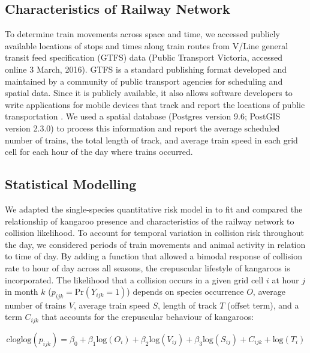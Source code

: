 \subsection{Characteristics of Railway Network}

To determine train movements across space and time, we accessed publicly available locations of stops and times along train routes from V/Line general transit feed specification (GTFS) data (Public Transport Victoria, accessed online 3 March, 2016).  GTFS is a standard publishing format developed and maintained by a community of public transport agencies for scheduling and spatial data.  Since it is publicly available, it also allows software developers to write applications for mobile devices that track and report the locations of public transportation \citep[see][]{hill11}.  We used a spatial database (Postgres version 9.6; PostGIS version 2.3.0) to process this information and report the average scheduled number of trains, the total length of track, and average train speed in each grid cell for each hour of the day where trains occurred.

\subsection{Statistical Modelling}

We adapted the single-species quantitative risk model in  to fit and compared the relationship of kangaroo presence and characteristics of the railway network to collision likelihood. To account for temporal variation in collision risk throughout the day, we considered periods of train movements and animal activity in relation to time of day. By adding a function that allowed a bimodal response of collision rate to hour of day across all seasons, the crepuscular lifestyle of kangaroos \citep[most active at dawn and dusk; see][]{daws12} is incorporated. The likelihood that a collision occurs in a given grid cell $i$ at hour $j$ in month $k$ ($p_{ijk} = \text{Pr}(Y_{ijk}=1)$) depends on species occurrence $O$, average number of trains $V$, average train speed $S$, length of track $T$ (offset term), and a term $C_{ijk}$ that accounts for the crepuscular behaviour of kangaroos:

\begin{equation} \label{eq:51}
\text{cloglog}(p_{ijk})=\beta_0+\beta_1\text{log}(O_i)+\beta_2\text{log}(V_{ij})+\beta_3\text{log}(S_{ij}) + C_{ijk} + \text{log}(T_i)
\end{equation}

